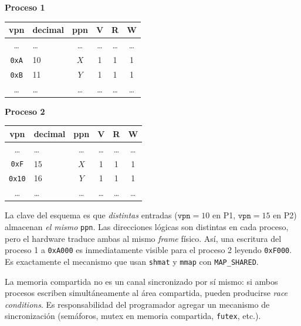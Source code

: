\documentclass[11pt,a4paper]{article}
\begin{document}
\begin{center}
\small
\textbf{Proceso 1} \\[0.3em]
\begin{tabular}{@{}clcccc@{}}
\toprule
vpn & decimal & ppn & V & R & W \\
\midrule
\ldots & \ldots & \ldots & \ldots & \ldots & \ldots \\
\texttt{0xA} & 10 & $X$ & 1 & 1 & 1 \\
\texttt{0xB} & 11 & $Y$ & 1 & 1 & 1 \\
\ldots & \ldots & \ldots & \ldots & \ldots & \ldots \\
\bottomrule
\end{tabular}
\qquad
\textbf{Proceso 2} \\[0.3em]
\begin{tabular}{@{}clcccc@{}}
\toprule
vpn & decimal & ppn & V & R & W \\
\midrule
\ldots & \ldots & \ldots & \ldots & \ldots & \ldots \\
\texttt{0xF}  & 15 & $X$ & 1 & 1 & 1 \\
\texttt{0x10} & 16 & $Y$ & 1 & 1 & 1 \\
\ldots & \ldots & \ldots & \ldots & \ldots & \ldots \\
\bottomrule
\end{tabular}
\end{center}

\begin{idea}
La clave del esquema es que \emph{distintas} entradas
($\texttt{vpn}=10$ en P1, $\texttt{vpn}=15$ en P2) almacenan
\emph{el mismo} \texttt{ppn}. Las direcciones lógicas son distintas
en cada proceso, pero el hardware traduce ambas al mismo \emph{frame}
físico. Así, una escritura del proceso 1 a \texttt{0xA000} es
inmediatamente visible para el proceso 2 leyendo \texttt{0xF000}. Es
exactamente el mecanismo que usan \texttt{shmat} y \texttt{mmap} con
\texttt{MAP\_SHARED}.
\end{idea}

\begin{importante}
La memoria compartida no es un canal sincronizado por sí mismo: si
ambos procesos escriben simultáneamente al área compartida, pueden
producirse \emph{race conditions}. Es responsabilidad del programador
agregar un mecanismo de sincronización (semáforos, mutex en memoria
compartida, \texttt{futex}, etc.).
\end{importante}

\end{document}

